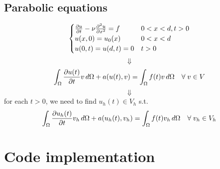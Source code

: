 \documentclass[a4paper,11pt]{article}
\theoremstyle{break}
\numberwithin{equation}{section}
\begin{document}
\subsection*{Parabolic equations}
\begin{equation*}
    \begin{cases}
        \partialderivative{u}{t} - \nu \partialderivative{^2u}{x^2} = f & 0 < x <d, t> 0 \\
        u(x,0) = u_0(x) & 0 < x < d \\
        u(0,t) = u(d,t) = 0 & t>0
    \end{cases}
    \label{one_dim_pbl}
\end{equation*}
\[
    \Downarrow
\]
\begin{equation*}
    \int_{\Omega} \partialderivative{u(t)}{t} v \, d\Omega + a(u(t), v) = \int_\Omega f(t)v \, d\Omega \quad \forall \; v \in V 
    \label{weak_formulation_heat_pbl}
\end{equation*}
\[
    \Downarrow
\]
for each \(t > 0\), we need to find \(u_h(t) \in V_h\) s.t. 
\begin{equation*}
    \int_\Omega \partialderivative{u_h(t)}{t} v_h \, d\Omega + a(u_h(t), v_h) = \int_\Omega f(t)v_h \, d\Omega \quad \forall \; v_h \in V_h
\label{semi-discretization_pbl}
\end{equation*}
\section*{Code implementation}
\end{document}
